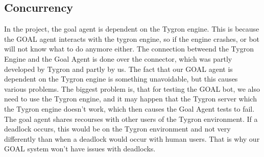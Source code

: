 \subsection{Concurrency}
In the project, the goal agent is dependent on the Tygron engine. This is because the GOAL agent interacts with the tygron engine, so if the engine crashes, or bot will not know what to do anymore either. The connection betweend the Tygron Engine and the Goal Agent is done over the connector, which was partly developed by Tygron and partly by us. The fact that our GOAL agent is dependent on the Tygron engine is something unavoidable, but this causes various problems. The biggest problem is, that for testing the GOAL bot, we also need to use the Tygron engine, and it may happen that the Tygron server which the Tygron engine doesn't work, which then causes the Goal Agent tests to fail. \\
The goal agent shares recourses with other users of the Tygron environment. If a deadlock occurs, this would be on the Tygron environment and not very differently than when a deadlock would occur with human users. That is why our GOAL system won't have issues with deadlocks.
\newpage
